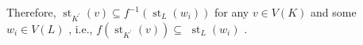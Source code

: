 Therefore, \({\operatorname{st}}_{{K}^{\prime }}\left( v\right)  \subseteq  {f}^{-1}\left( {{\operatorname{st}}_{L}\left( {w}_{i}\right) }\right)\) for any \(v \in  V\left( K\right)\) and some \({w}_{i} \in  V\left( L\right)\) , i.e., \(f\left( {{\operatorname{st}}_{{K}^{\prime }}\left( v\right) }\right)  \subseteq\)  \({\operatorname{st}}_{L}\left( {w}_{i}\right)\) .